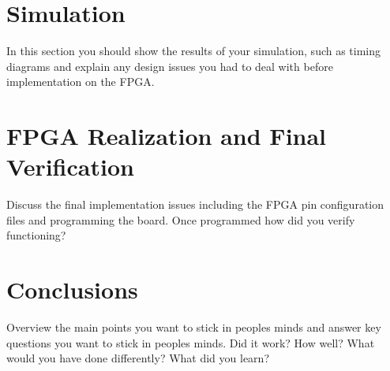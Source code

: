 \documentclass{article}\usepackage{graphicx} %
\begin{document}
\section{Simulation}
In this section you should show the results of your simulation, such as timing diagrams and explain any design issues you had to deal with before implementation on the FPGA.
\section{FPGA Realization and Final Verification}
Discuss the final implementation issues including the FPGA pin configuration files and programming the board.  Once programmed how did you verify functioning?
\section{Conclusions}
Overview the main points you want to stick in peoples minds and answer key questions you want to stick in peoples minds.  Did it work?  How well? What would you have done differently?  What did you learn?
\end{document}
